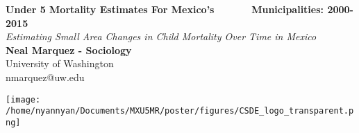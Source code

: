 \documentclass[a0,portrait]{a0poster}
\begin{document}


\begin{minipage}[b]{0.67\linewidth}
\veryHuge \color{Crimson} \textbf{Under 5 Mortality Estimates For Mexico's ~~~~~~Municipalities: 2000-2015} \color{Black}\\ %
\Huge\textit{Estimating Small Area Changes in Child Mortality Over Time in Mexico}\\[2cm] %
\huge \textbf{Neal Marquez - Sociology}\\[0.5cm] %
\huge University of Washington\\[0.4cm] %
\Large nmarquez@uw.edu\\
\end{minipage}
%
\begin{minipage}[b]{0.33\linewidth}
\texttt{[image: /home/nyannyan/Documents/MXU5MR/poster/figures/CSDE\_logo\_transparent.png]}\\
\end{minipage}

\vspace{1cm} %



\end{document}
